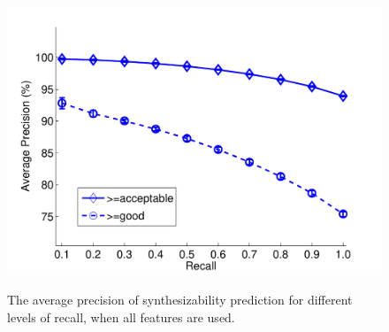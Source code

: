 \begin{figure} 
 \centering
\includegraphics[width=0.7\linewidth]{./forecasting/figs/AP_curve_all.pdf} \\ 
\caption{The average precision of synthesizability prediction for different levels of recall, when all features are used. }
  \label{te:fig:curve}
\end{figure}


